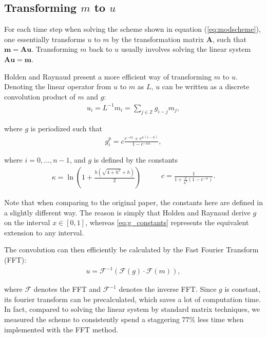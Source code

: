 \subsection*{Transforming $m$ to $u$}

For each time step when solving the scheme shown in equation (\ref{eq:modscheme}), one essentially transforms $u$ to $m$ by the transformation matrix $\bm{A}$, such that $\bm{m} = \bm{Au}$. Transforming $m$ back to $u$ usually involves solving the linear system $\bm{Au} = \bm{m}$. 

Holden and Raynaud \cite{holden2006convergence} present a more efficient way of transforming $m$ to $u$. Denoting the linear operator from $u$ to $m$ as $L$, $u$ can be written as a discrete convolution product of $m$ and $g$:
\begin{align*}
u_i = L^{-1} m_i = \sum\limits_{j \in \mathds{Z}} g_{i - j} m_j,
\end{align*}

where $g$ is periodized such that
\begin{align*}
g_i^p = c \frac{e^{-\kappa i} + e^{\kappa (i - n)}}{1 - e^{-\kappa n}},
\end{align*}

where $i = 0, ..., n - 1$, and $g$ is defined by the constants
\begin{equation}
\label{eq:g_constants}
\begin{aligned}
\kappa = \ln \left( 1 + \frac{h(\sqrt{4 + h^2} + h)}{2} \right)
\end{aligned}
\qquad
\begin{aligned}
c = \frac{1}{1 + \frac{2}{h^2} (1 - e^{-\kappa})}.
\end{aligned}
\end{equation}

Note that when comparing to the original paper, the constants here are defined in a slightly different way. The reason is simply that Holden and Raynaud derive $g$ on the interval $x \in [0, 1]$, whereas \eqref{eq:g_constants} represents the equivalent extension to any interval.

The convolution can then efficiently be calculated by the Fast Fourier Transform (FFT):
\begin{align*}
u = \mathcal{F}^{-1} (\mathcal{F} (g) \cdot \mathcal{F}(m)),
\end{align*}

where $\mathcal{F}$ denotes the FFT and $\mathcal{F}^{-1}$ denotes the inverse FFT. Since $g$ is constant, its fourier transform can be precalculated, which saves a lot of computation time. In fact, compared to solving the linear system by standard matrix techniques, we measured the scheme to consistently spend a staggering $77\%$ less time when implemented with the FFT method.

